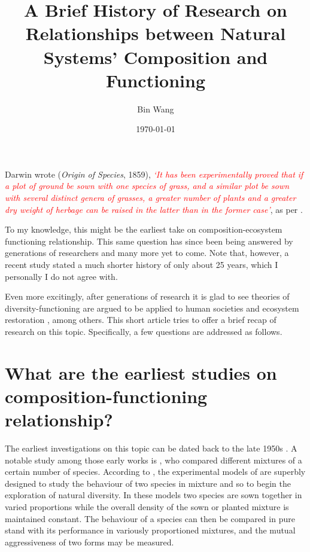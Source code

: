\documentclass[letterpaper, 10pt]{article}
\begin{document}
\setlength{\droptitle}{-10em} 
\title{\textbf{A Brief History of Research on Relationships between Natural Systems' Composition and
Functioning}\vspace{-0em}}
\author{Bin Wang\vspace{-1em}}
\date{\today\vspace{-1em}}
\maketitle

Darwin wrote (\textit{Origin of Species}, 1859), \textcolor{red}{\textit{`It has been experimentally proved that if a plot of ground be sown with one species of grass, and a similar plot be sown with several distinct genera of grasses, a greater number of plants and a greater dry weight of herbage can be raised in the latter than in the former case'}}, as per \citet{harperdarwinian}. 

To my knowledge, this might be the earliest take on composition-ecosystem functioning relationship. This same question has since been being answered by generations of researchers and many more yet to come. Note that, however, a recent study stated a much shorter history of only about 25 years\citep{jochum2020results}, which I personally I do not agree with.

Even more excitingly, after generations of research it is glad to see theories of diversity-functioning are argued to be applied to human societies\citep{dunn2019biodiversity} and ecosystem restoration \citep{zhang2020improve}, among others. This short article tries to offer a brief recap of research on this topic. Specifically, a few questions are addressed as follows.

\section{What are the earliest studies on composition-functioning relationship?}
The earliest investigations on this topic can be dated back to the late 1950s \citep{de1960competitionthesis, de1960competition, harperdarwinian}. A notable study among those early works is \citep{de1960competition}, who compared different mixtures of a certain number of species. According to \citep{harperdarwinian}, the experimental models of \citep{de1960competition} are superbly designed to study the behaviour of two species in mixture and so to begin the exploration of natural diversity. In these models two species are sown together in varied proportions while the overall density of the sown or planted mixture is maintained constant. The behaviour of a species can then be compared in pure stand with its performance in variously proportioned mixtures, and the mutual aggressiveness of two forms may be measured.
\end{document}
